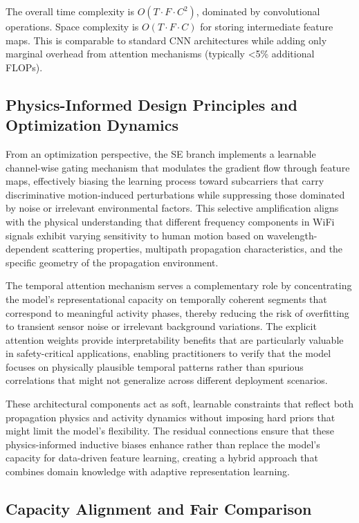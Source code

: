 \documentclass[journal]{IEEEtran}
\begin{document}
The overall time complexity is $O(T \cdot F \cdot C^2)$, dominated by convolutional operations. Space complexity is $O(T \cdot F \cdot C)$ for storing intermediate feature maps. This is comparable to standard CNN architectures while adding only marginal overhead from attention mechanisms (typically <5\% additional FLOPs).

\subsection{Physics-Informed Design Principles and Optimization Dynamics}

From an optimization perspective, the SE branch implements a learnable channel-wise gating mechanism that modulates the gradient flow through feature maps, effectively biasing the learning process toward subcarriers that carry discriminative motion-induced perturbations while suppressing those dominated by noise or irrelevant environmental factors. This selective amplification aligns with the physical understanding that different frequency components in WiFi signals exhibit varying sensitivity to human motion based on wavelength-dependent scattering properties, multipath propagation characteristics, and the specific geometry of the propagation environment.

The temporal attention mechanism serves a complementary role by concentrating the model's representational capacity on temporally coherent segments that correspond to meaningful activity phases, thereby reducing the risk of overfitting to transient sensor noise or irrelevant background variations. The explicit attention weights provide interpretability benefits that are particularly valuable in safety-critical applications, enabling practitioners to verify that the model focuses on physically plausible temporal patterns rather than spurious correlations that might not generalize across different deployment scenarios.

These architectural components act as soft, learnable constraints that reflect both propagation physics and activity dynamics without imposing hard priors that might limit the model's flexibility. The residual connections ensure that these physics-informed inductive biases enhance rather than replace the model's capacity for data-driven feature learning, creating a hybrid approach that combines domain knowledge with adaptive representation learning.

\subsection{Capacity Alignment and Fair Comparison}
\end{document}
